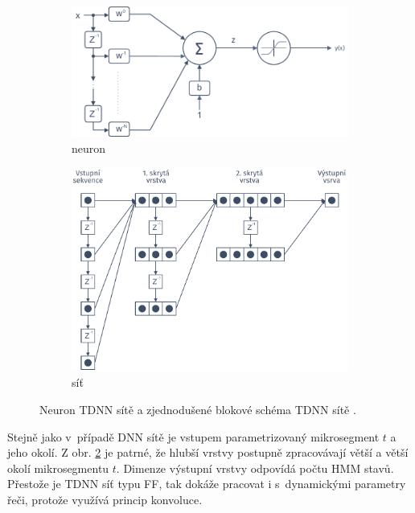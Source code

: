 \begin{figure}[htpb]
  \centering
  \begin{subfigure}[b]{0.45\textwidth}
    \includegraphics[width=\textwidth]{./ch4-asr/img/neuron-tdnn.pdf}
    \caption{neuron}
    \label{fig:asr:acoustic:dnn:tdnn:neuron}
  \end{subfigure}
  \begin{subfigure}[b]{0.35\textwidth}
    \includegraphics[width=\textwidth]{./ch4-asr/img/tdnn.pdf}
    \caption{síť}
    \label{fig:asr:acoustic:dnn:tdnn:net}
  \end{subfigure}
  \caption[Neuron TDNN sitě a její zjednodušené blokové schéma.]{Neuron TDNN sítě a zjednodušené blokové schéma TDNN sítě \cite{Craig2000}.}
  \label{fig:asr:acoustic:dnn:tdnn}
\end{figure}

Stejně jako v~případě DNN sítě je vstupem parametrizovaný mikrosegment $t$ a jeho okolí. Z obr. \ref{fig:asr:acoustic:dnn:tdnn:net} je patrné, že hlubší vrstvy postupně zpracovávají větší a větší okolí mikrosegmentu $t$. Dimenze výstupní vrstvy odpovídá počtu HMM stavů. Přestože je TDNN síť typu FF, tak dokáže pracovat i s~dynamickými parametry řeči, protože využívá princip konvoluce.
